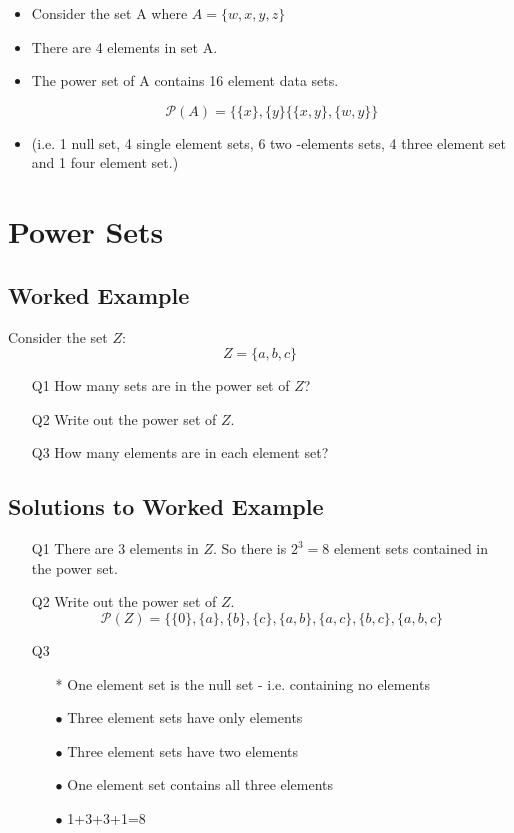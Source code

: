 \documentclass[12pt]{article}
\begin{document}
\begin{itemize}

\item Consider the set A where $ A = \{w,x,y,z\}$
\item There are 4 elements in set A.

\item The power set of A contains 16 element data sets.

 \[  \mathcal{P}(A) = \{\{ x \}, \{ y \} \{\{ x,y \}, \{ w,y \}\}  \]

\item (i.e. 1 null set, 4 single element sets, 6 two -elements sets, 4 three element set and 1 four element set.)

\end{itemize}


\section*{Power Sets}
\subsection*{Worked Example}
Consider the set $Z$:
\[ Z = \{ a,b,c\}  \]
\begin{itemize}
\item[Q1] How many sets are in the power set of $Z$? 
\item[Q2] Write out the power set of $Z$. 
\item[Q3] How many elements are in each element set?
\end{itemize}
\subsection*{Solutions to Worked Example}

\begin{itemize}


\item[Q1] There are 3 elements in $Z$. So there is $2^3 = 8$ element sets contained in the power set.

\item[Q2] Write out the power set of $Z$.
\[ \mathcal{P}(Z) = \{ \{0\}, \{a\}, \{b\}, \{c\}, \{a,b\}, \{a,c\}, \{b,c\}, \{a,b,c\} \]

\item[Q3]
\begin{itemize}
\item[*] One element set is the null set - i.e. containing no
elements \item[$\bullet$] Three element sets have only elements \item[$\bullet$]
Three element sets have two elements \item[$\bullet$] One element set
contains all three elements \item[$\bullet$] 1+3+3+1=8
\end{itemize}
\end{itemize}
\end{document}
